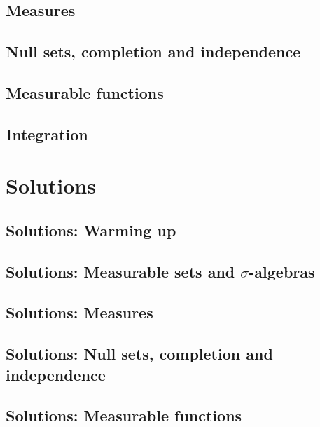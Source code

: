 \documentclass{easyclass}
\begin{document}
\chapter{Measures}



\chapter{Null sets, completion and independence}



\chapter{Measurable functions}



\chapter{Integration}




\part{Solutions}

\chapter{Solutions: Warming up}



\chapter{Solutions: Measurable sets and \texorpdfstring{$\sigma$}{}-algebras}



\chapter{Solutions: Measures}



\chapter{Solutions: Null sets, completion and independence}



\chapter{Solutions: Measurable functions}


\end{document}
